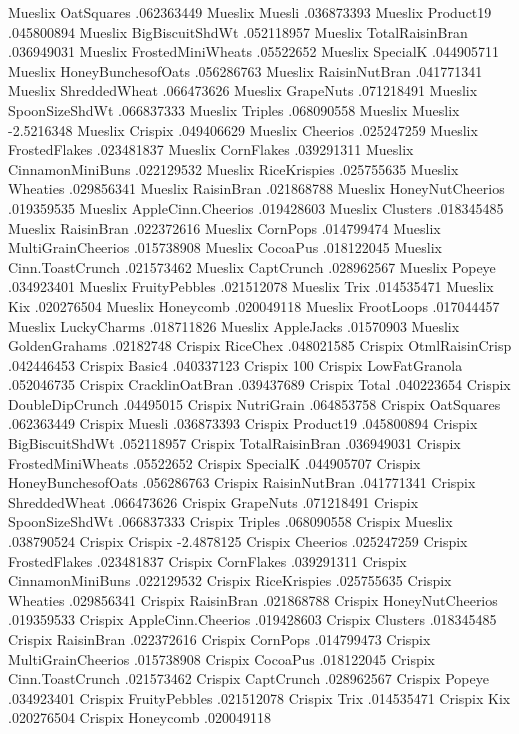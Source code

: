Mueslix	OatSquares	.062363449
Mueslix	Muesli	.036873393
Mueslix	Product19	.045800894
Mueslix	BigBiscuitShdWt	.052118957
Mueslix	TotalRaisinBran	.036949031
Mueslix	FrostedMiniWheats	.05522652
Mueslix	SpecialK	.044905711
Mueslix	HoneyBunchesofOats	.056286763
Mueslix	RaisinNutBran	.041771341
Mueslix	ShreddedWheat	.066473626
Mueslix	GrapeNuts	.071218491
Mueslix	SpoonSizeShdWt	.066837333
Mueslix	Triples	.068090558
Mueslix	Mueslix	-2.5216348
Mueslix	Crispix	.049406629
Mueslix	Cheerios	.025247259
Mueslix	FrostedFlakes	.023481837
Mueslix	CornFlakes	.039291311
Mueslix	CinnamonMiniBuns	.022129532
Mueslix	RiceKrispies	.025755635
Mueslix	Wheaties	.029856341
Mueslix	RaisinBran	.021868788
Mueslix	HoneyNutCheerios	.019359535
Mueslix	AppleCinn.Cheerios	.019428603
Mueslix	Clusters	.018345485
Mueslix	RaisinBran	.022372616
Mueslix	CornPops	.014799474
Mueslix	MultiGrainCheerios	.015738908
Mueslix	CocoaPus	.018122045
Mueslix	Cinn.ToastCrunch	.021573462
Mueslix	CaptCrunch	.028962567
Mueslix	Popeye	.034923401
Mueslix	FruityPebbles	.021512078
Mueslix	Trix	.014535471
Mueslix	Kix	.020276504
Mueslix	Honeycomb	.020049118
Mueslix	FrootLoops	.017044457
Mueslix	LuckyCharms	.018711826
Mueslix	AppleJacks	.01570903
Mueslix	GoldenGrahams	.02182748
Crispix	RiceChex	.048021585
Crispix	OtmlRaisinCrisp	.042446453
Crispix	Basic4	.040337123
Crispix	100%
Crispix	LowFatGranola	.052046735
Crispix	CracklinOatBran	.039437689
Crispix	Total	.040223654
Crispix	DoubleDipCrunch	.04495015
Crispix	NutriGrain	.064853758
Crispix	OatSquares	.062363449
Crispix	Muesli	.036873393
Crispix	Product19	.045800894
Crispix	BigBiscuitShdWt	.052118957
Crispix	TotalRaisinBran	.036949031
Crispix	FrostedMiniWheats	.05522652
Crispix	SpecialK	.044905707
Crispix	HoneyBunchesofOats	.056286763
Crispix	RaisinNutBran	.041771341
Crispix	ShreddedWheat	.066473626
Crispix	GrapeNuts	.071218491
Crispix	SpoonSizeShdWt	.066837333
Crispix	Triples	.068090558
Crispix	Mueslix	.038790524
Crispix	Crispix	-2.4878125
Crispix	Cheerios	.025247259
Crispix	FrostedFlakes	.023481837
Crispix	CornFlakes	.039291311
Crispix	CinnamonMiniBuns	.022129532
Crispix	RiceKrispies	.025755635
Crispix	Wheaties	.029856341
Crispix	RaisinBran	.021868788
Crispix	HoneyNutCheerios	.019359533
Crispix	AppleCinn.Cheerios	.019428603
Crispix	Clusters	.018345485
Crispix	RaisinBran	.022372616
Crispix	CornPops	.014799473
Crispix	MultiGrainCheerios	.015738908
Crispix	CocoaPus	.018122045
Crispix	Cinn.ToastCrunch	.021573462
Crispix	CaptCrunch	.028962567
Crispix	Popeye	.034923401
Crispix	FruityPebbles	.021512078
Crispix	Trix	.014535471
Crispix	Kix	.020276504
Crispix	Honeycomb	.020049118

